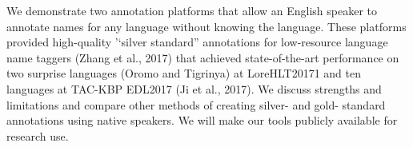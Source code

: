 We demonstrate two annotation platforms that allow an English speaker to annotate names for any language without knowing the language. These platforms provided high-quality '‘silver standard'' annotations for low-resource language name taggers (Zhang et al., 2017) that achieved state-of-the-art performance on two surprise languages (Oromo and Tigrinya) at LoreHLT20171 and ten languages at TAC-KBP EDL2017 (Ji et al., 2017). We discuss strengths and limitations and compare other methods of creating silver- and gold- standard annotations using native speakers. We will make our tools publicly available for research use.
